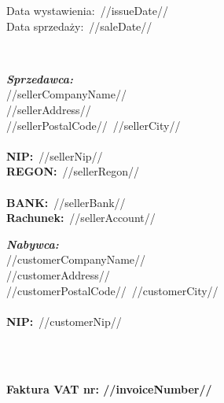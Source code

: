 \documentclass[12pt]{article}
\newcommand{\nipText}{\textbf{NIP:}}
\newcommand{\regonText}{\textbf{REGON:}}
\newcommand{\bankText}{\textbf{BANK:}}
\newcommand{\accountText}{\textbf{Rachunek:}}
\begin{document}
    \begin{footnotesize}
        \begin{flushright}
            \begin{minipage}[t]{.4\textwidth}
                Data wystawienia:~//issueDate// \\
                Data sprzedaży:~//saleDate//
            \end{minipage}
        \end{flushright}
    \end{footnotesize}

    \ \\

    \begin{small}
        \begin{minipage}[t]{.6\textwidth}
            \textbf{\emph{Sprzedawca:}} \\
            //sellerCompanyName// \\
            //sellerAddress// \\
            //sellerPostalCode//~//sellerCity// \\ \\
            \nipText~//sellerNip// \\
            \regonText~//sellerRegon// \\ \\
            \bankText~//sellerBank// \\
            \accountText~//sellerAccount//
        \end{minipage}
        \begin{minipage}[t]{\textwidth}
            \textbf{\emph{Nabywca:}} \\
            //customerCompanyName// \\
            //customerAddress// \\
            //customerPostalCode//~//customerCity// \\ \\
            \nipText~//customerNip//
        \end{minipage}
    \end{small}

    \ \\ \ \\

    \centerline{\textbf{\LARGE{Faktura VAT nr: //invoiceNumber//}}}

    \ \\
\end{document}
